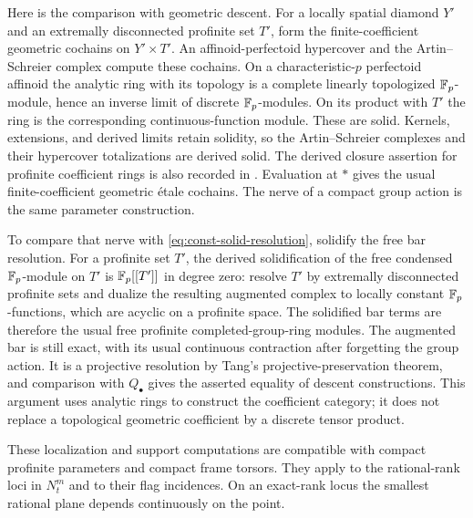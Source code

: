 Here is the comparison with geometric descent.  For a locally spatial
diamond $Y'$ and an extremally disconnected profinite set $T'$, form
the finite-coefficient geometric cochains on $Y'\times T'$.
An affinoid-perfectoid hypercover and the Artin--Schreier complex compute
these cochains.  On a characteristic-$p$ perfectoid affinoid the analytic
ring with its topology is a complete linearly topologized $\mathbb F_p$-module,
hence an inverse limit of discrete $\mathbb F_p$-modules.  On its product with
$T'$ the ring is the corresponding continuous-function module.  These
are solid.  Kernels, extensions, and derived limits retain solidity, so
the Artin--Schreier complexes and their hypercover totalizations are
derived solid.  The derived closure assertion for profinite coefficient
rings is also recorded in \cite[Theorem~4.4(ii)]{Tang}.  Evaluation at
$*$ gives the usual finite-coefficient geometric \'{e}tale cochains.
The nerve of a compact group action is the same parameter construction.

To compare that nerve with \eqref{eq:const-solid-resolution}, solidify
the free bar resolution.  For a profinite set $T'$, the derived
solidification of the free condensed $\mathbb F_p$-module on $T'$ is
$\mathbb F_p[[T']]$ in degree zero: resolve $T'$ by extremally disconnected
profinite sets and dualize the resulting augmented complex to locally
constant $\mathbb F_p$-functions, which are acyclic on a profinite space.
The solidified bar terms are therefore the usual free profinite
completed-group-ring modules.  The augmented bar is still exact,
with its usual continuous contraction after forgetting the group
action.  It is a projective resolution by Tang's
projective-preservation theorem, and comparison with $Q_\bullet$
gives the asserted equality of descent constructions.  This argument
uses analytic rings to construct the coefficient category; it does
not replace a topological geometric coefficient by a discrete tensor
product.

\begin{lemma}\label{support:parameters}
These localization and support computations are compatible with
compact profinite parameters and compact frame torsors.  They apply
to the rational-rank loci in $N_t^m$ and to their flag incidences.
On an exact-rank locus the smallest rational plane depends
continuously on the point.
\end{lemma}

